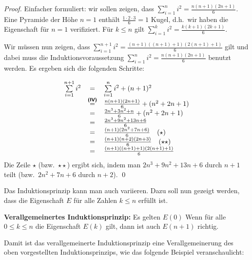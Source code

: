 \goodbreak
\begin{proof}
Einfacher formuliert: wir sollen zeigen, dass $\sum\limits_{i=1}^n i^2 =
\frac{n(n+1)(2n+1)}{6}$.
\induproof%
{Eine Pyramide der Höhe $n = 1$ enthält $\frac{1 \cdot 2 \cdot 3}{6} =
  1$ Kugel, d.h.~wir haben die Eigenschaft für $n = 1$ verifiziert.}%
{Für $k \le n$ gilt $\sum\limits_{i=1}^k i^2 = \frac{k(k+1)(2k+1)}{6}$.}%
{%
Wir müssen nun zeigen, dass $\sum\limits_{i=1}^{n+1} i^2 =
\frac{(n+1)((n+1)+1)(2(n+1)+1)}{6}$ gilt und dabei muss die
Induktionsvoraussetzung $\sum\limits_{i=1}^n i^2 = \frac{n(n+1)(2n+1)}{6}$
benutzt werden. Es ergeben sich die folgenden Schritte: 

\begin{displaymath}
\begin{array}{rcl}
\sum\limits_{i=1}^{n+1}i^2 &=& \sum\limits_{i=1}^{n}i^2 + (n + 1)^2\\
&\stackrel{\text{\textbf{\textsf{(IV)}}}}{=}& \frac{n(n+1)(2n+1)}{6} +
(n^2 + 2n + 1)\\
&=& \frac{2n^3 + 3n^2+n}{6} + (n^2 + 2n + 1)\\
&=& \frac{2n^3 + 9n^2+13n + 6}{6}\\
&=& \frac{(n+1)(2n^2+7n+6)}{6} \quad (\star)\\
&=& \frac{(n+1)(n+2)(2n+3)}{6} \quad (\star\star)\\
&=& \frac{(n+1)((n+1) + 1)(2(n + 1) + 1)}{6}\\
\end{array}
\end{displaymath}
Die Zeile $\star$ (bzw.~$\star\star$) ergibt sich, indem man $2n^3 +
9n^2+13n + 6$ durch $n+1$ teilt (bzw.~$2n^2+7n+6$ durch $n+2$). \qed
}
\end{proof}

Das Induktionsprinzip kann man auch variieren. Dazu soll nun gezeigt
werden, dass die Eigenschaft $E$ für alle Zahlen $k \le n$ erfüllt
ist.

\noindent\textbf{Verallgemeinertes Induktionsprinzip:} Es gelten 
\indudef%
{$E(0)$}%
{Wenn für alle $0 \le k \le n$ die Eigenschaft $E(k)$ gilt, dann ist 
auch $E(n+1)$ richtig.}
\medskip

Damit ist das verallgemeinerte Induktionsprinzip eine
Verallgemeinerung des oben vorgestellten Induktionsprinzips, wie das
folgende Beispiel veranschaulicht:

